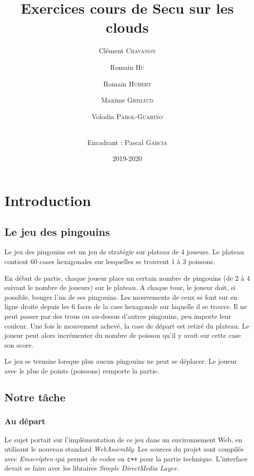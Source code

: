 \documentclass[a4paper,11pt]{article}
\title{\textbf{Exercices cours de Secu sur les clouds}}
\author{Clément \textsc{Chavanon} \and Romain \textsc{Hu} \and Romain
\textsc{Hubert} \and Maxime \textsc{Grimaud} \and Volodia
\textsc{Parol-Guarino} \and 
 \\ Encadrant : Pascal \textsc{Garcia}}
\date{2019-2020}
\begin{document}
\maketitle
\begin{abstract}

\end{abstract}

\hypertarget{introduction}{%
\section*{Introduction}\label{introduction}}

\hypertarget{le-jeu-des-pingouins}{%
\subsection{Le jeu des pingouins}\label{le-jeu-des-pingouins}}

Le jeu des pingouins est un jeu de stratégie sur plateau de 4 joueurs.
Le plateau contient 60 cases hexagonales sur lesquelles se trouvent 1 à
3 poissons.

En début de partie, chaque joueur place un certain nombre de pingouins
(de 2 à 4 suivant le nombre de joueurs) sur le plateau. A chaque tour,
le joueur doit, si possible, bouger l'un de ses pingouins. Les
mouvements de ceux se font sur en ligne droite depuis les 6 faces de la
case hexagonale sur laquelle il se trouve. Il ne peut passer par des
trous ou au-dessus d'autres pingouins, peu importe leur couleur. Une
fois le mouvement achevé, la case de départ est retiré du plateau. Le
joueur peut alors incrémenter du nombre de poisson qu'il y avait sur
cette case son score.

Le jeu se termine lorsque plus aucun pingouins ne peut se déplacer. Le
joueur avec le plus de points (poissons) remporte la partie.

\hypertarget{notre-tuxe2che}{%
\subsection{Notre tâche}\label{notre-tuxe2che}}

\hypertarget{au-duxe9part}{%
\subsubsection{Au départ}\label{au-duxe9part}}

Le sujet portait sur l'implémentation de ce jeu dans un environnement
Web, en utilisant le nouveau standard \emph{WebAssembly}. Les sources du
projet sont compilés avec \emph{Emscripten} qui permet de coder en
\texttt{c++} pour la partie technique. L'interface devait se faire avec
les libraires \emph{Simple DirectMedia Layer}.
\end{document}
